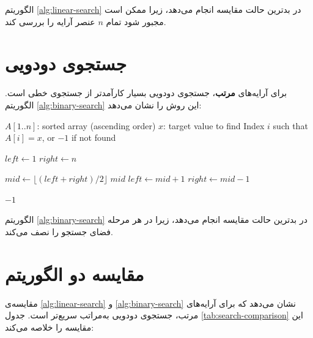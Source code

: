 \documentclass{matinbook}
\begin{document}
\begin{theorem}
    الگوریتم \cref{alg:linear-search} در بدترین حالت
     مقایسه انجام می‌دهد، زیرا ممکن است مجبور
    شود تمام $n$ عنصر آرایه را بررسی کند.
    \label{thm:linear-complexity}
\end{theorem}

\section{جستجوی دودویی}
\label{sec:search-binary}

برای آرایه‌های \textbf{مرتب}، جستجوی دودویی بسیار
کارآمدتر از جستجوی خطی است. الگوریتم
\cref{alg:binary-search} این روش را نشان می‌دهد:

\begin{latin}
\begin{algorithm}
\caption{جستجوی دودویی}
\label{alg:binary-search}
\begin{algorithmic}[1]
    \Require $A[1..n]$: sorted array (ascending order)
    \Require $x$: target value to find
    \Ensure Index $i$ such that $A[i] = x$, or $-1$ if not found

    \State $left \gets 1$
    \State $right \gets n$

        \State $mid \gets \lfloor (left + right) / 2 \rfloor$
            \State \Return $mid$
            \State $left \gets mid + 1$
        \Else
            \State $right \gets mid - 1$
        \EndIf
    \EndWhile

    \State \Return $-1$
\end{algorithmic}
\end{algorithm}
\end{latin}

\begin{theorem}
    الگوریتم \cref{alg:binary-search} در بدترین حالت
     مقایسه انجام می‌دهد، زیرا در هر
    مرحله فضای جستجو را نصف می‌کند.
    \label{thm:binary-complexity}
\end{theorem}

\section{مقایسه دو الگوریتم}
\label{sec:search-comparison}

مقایسه‌ی \cref{alg:linear-search} و
\cref{alg:binary-search} نشان می‌دهد که برای آرایه‌های
مرتب، جستجوی دودویی به‌مراتب سریع‌تر است. جدول
\cref{tab:search-comparison} این مقایسه را خلاصه می‌کند:
\end{document}
